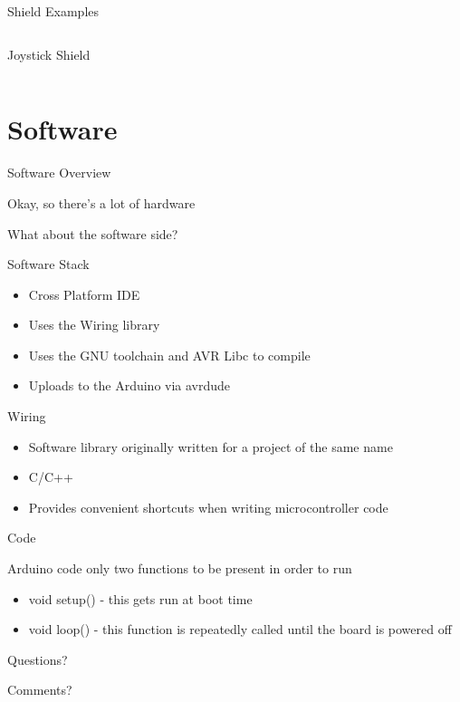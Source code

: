 \documentclass{beamer}
\begin{document}
\begin{frame}{Shield Examples}
\begin{columns}
\begin{column}{0.5\textwidth}
      \centerline{Joystick Shield}
    \end{column}
  \end{columns}
\end{frame}


\section{Software}
\begin{frame}{Software Overview}
  \centerline{Okay, so there's a lot of hardware}
  \centerline{What about the software side?}
\end{frame}

\begin{frame}{Software Stack}
  \begin{centering}
    \begin{itemize}
      \item Cross Platform IDE
      \item Uses the Wiring library
      \item Uses the GNU toolchain and AVR Libc to compile
      \item Uploads to the Arduino via avrdude
    \end{itemize}
  \end{centering}
\end{frame}

\begin{frame}{Wiring}
  \begin{centering}
    \begin{itemize}
      \item Software library originally written for a project of the same name
      \item C/C++
      \item Provides convenient shortcuts when writing microcontroller code
    \end{itemize}
  \end{centering}
\end{frame}

\begin{frame}{Code}
  \begin{centering}
    Arduino code only two functions to be present in order to run
    \begin{itemize}
      \item void setup() - this gets run at boot time
      \item void loop() - this function is repeatedly called until the board is powered off
    \end{itemize}
  \end{centering}
\end{frame}


\begin{frame}
  \centerline{\huge Questions?}
  \centerline{Comments?}
\end{frame}
\end{document}
